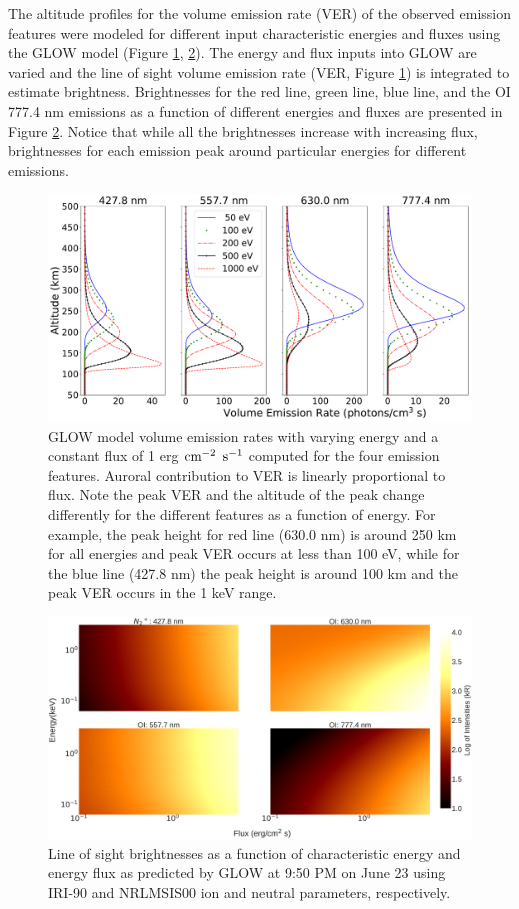 \documentclass[crop=false,class=mitthesis,oneside,font=12pt]{standalone}
\begin{document}
 The altitude profiles for the volume emission rate (VER) of the observed emission features were modeled for different input characteristic energies and fluxes using the GLOW model (Figure \ref{fig:vve}, \ref{fig:bve}). 
The energy and flux inputs into GLOW are varied and the line of sight volume emission rate (VER, Figure \ref{fig:vve}) is integrated to estimate brightness. Brightnesses for the red line, green line, blue line, and the OI 777.4 nm emissions as a function of different energies and fluxes are presented in Figure \ref{fig:bve}. Notice that while all the brightnesses increase with increasing flux, brightnesses for each emission peak around particular energies for different emissions.
\begin{figure}[H]
	\centering\includegraphics[width=35pc]{ver_vs_e.pdf}
	\caption{GLOW model volume emission rates with varying energy and a constant flux of 1 erg $\rm cm^{-2}$ $\rm s^{-1}$ computed for the four emission features. Auroral contribution to VER is linearly proportional to flux. Note the peak VER and the altitude of the peak change differently for the different features as a function of energy. For
		example, the peak height for red line (630.0 nm) is around 250 km for all energies and peak VER occurs at less than 100 eV, while for the blue line (427.8 nm) the peak height is around 100 km and the peak VER occurs in the 1 keV range.}
	\label{fig:vve}
\end{figure}
\begin{figure}[H]
	\centering\includegraphics[width=35pc]{b_vs_e.pdf}
	\caption{Line of sight brightnesses as a function of characteristic energy and energy flux as predicted by GLOW at 9:50 PM on June 23 using IRI-90 and NRLMSIS00 ion and neutral parameters, respectively.}
	\label{fig:bve}
\end{figure}
\end{document}
